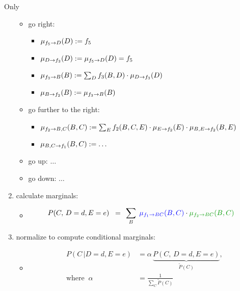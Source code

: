 \begin{frame}{Only}
\begin{enumerate}
 \begin{itemize}
  \item<only@7> go right:
  \begin{itemize}
    \item $\mu_{f_{5}\rightarrow D}(D) := f_{5}$
    \item $\mu_{D\rightarrow f_{3}}(D) := \mu_{f_{5}\rightarrow D}(D) = f_{5}$
    \item $\mu_{f_{3}\rightarrow B}(B) := \sum_{D} f_{3}(B,D) \cdot \mu_{D\rightarrow f_{3}}(D)$  
    \item $\mu_{B\rightarrow f_{2}}(B) := \mu_{f_{3}\rightarrow B}(B)$    
    \end{itemize}
  \item<only@8-9> go further to the right:
  \begin{itemize}
  \item $\mu_{f_{2}\rightarrow B,C}(B,C) := \sum_{E} f_{2}(B,C,E) \cdot \mu_{E\rightarrow f_{2}}(E) \cdot \mu_{B,E\rightarrow f_{2}}(B,E)$
  \item $\mu_{B,C\rightarrow f_{1}}(B,C) := \ldots$ 
  \end{itemize}
  \item go up: $\ldots$
  \item go down: $\ldots$
  \end{itemize}
  \item<only@10> calculate marginals:
  \begin{itemize}
  \item \begin{align}
					P(C, \,D = d, E = e) 
						\;\; =& \;\; \sum_{B}{} \;
							{\color{blue}\mu_{f_1 \to BC}(B,C)} \cdot 
							{\color{darkgreen} \mu_{f_2 \to BC}(B,C)} 
		\end{align}
  \end{itemize}
  \item<only@11> normalize to compute conditional marginals:
  \begin{itemize}
  \item[]
  \slidesonly{\vspace{-3mm}}
   \begin{align}
            P(C\, | D = d, E = e) &= \alpha \, \underbrace{P(C, \,D = d, E = e)}_{\tilde P(C)},\\
            \text{where} \;\; \alpha &= \frac{1}{\sum_C \tilde P(C)}
		\end{align}
  \end{itemize}
  
\end{enumerate}
 \endgroup
\end{frame}

